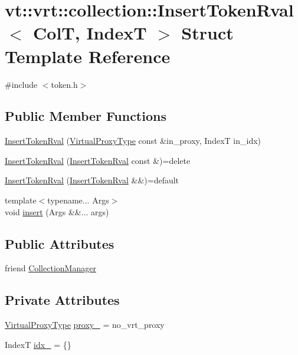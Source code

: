 \hypertarget{structvt_1_1vrt_1_1collection_1_1_insert_token_rval}{}\section{vt\+:\+:vrt\+:\+:collection\+:\+:Insert\+Token\+Rval$<$ ColT, IndexT $>$ Struct Template Reference}
\label{structvt_1_1vrt_1_1collection_1_1_insert_token_rval}


{\ttfamily \#include $<$token.\+h$>$}

\subsection*{Public Member Functions}
\begin{DoxyCompactItemize}
\item 
\hyperlink{structvt_1_1vrt_1_1collection_1_1_insert_token_rval_a346da7d8d739227c8918399c43095e16}{Insert\+Token\+Rval} (\hyperlink{namespacevt_a1b417dd5d684f045bb58a0ede70045ac}{Virtual\+Proxy\+Type} const \&in\+\_\+proxy, IndexT in\+\_\+idx)
\item 
\hyperlink{structvt_1_1vrt_1_1collection_1_1_insert_token_rval_aea48b21e03ac5cab59b9e470af56f8c6}{Insert\+Token\+Rval} (\hyperlink{structvt_1_1vrt_1_1collection_1_1_insert_token_rval}{Insert\+Token\+Rval} const \&)=delete
\item 
\hyperlink{structvt_1_1vrt_1_1collection_1_1_insert_token_rval_ad7bd979f47256df2d3357e2232ca23c2}{Insert\+Token\+Rval} (\hyperlink{structvt_1_1vrt_1_1collection_1_1_insert_token_rval}{Insert\+Token\+Rval} \&\&)=default
\item 
{\footnotesize template$<$typename... Args$>$ }\\void \hyperlink{structvt_1_1vrt_1_1collection_1_1_insert_token_rval_a24233cafaa4d9a311c757573e3a61352}{insert} (Args \&\&... args)
\end{DoxyCompactItemize}
\subsection*{Public Attributes}
\begin{DoxyCompactItemize}
\item 
friend \hyperlink{structvt_1_1vrt_1_1collection_1_1_insert_token_rval_a10b822803e1ad9860efabbb9d979c842}{Collection\+Manager}
\end{DoxyCompactItemize}
\subsection*{Private Attributes}
\begin{DoxyCompactItemize}
\item 
\hyperlink{namespacevt_a1b417dd5d684f045bb58a0ede70045ac}{Virtual\+Proxy\+Type} \hyperlink{structvt_1_1vrt_1_1collection_1_1_insert_token_rval_a9eb736a9d35655244886202938b41a60}{proxy\+\_\+} = no\+\_\+vrt\+\_\+proxy
\item 
IndexT \hyperlink{structvt_1_1vrt_1_1collection_1_1_insert_token_rval_a24f53a4a29fa2a3ef166619b7e9ba4f2}{idx\+\_\+} = \{\}
\end{DoxyCompactItemize}


